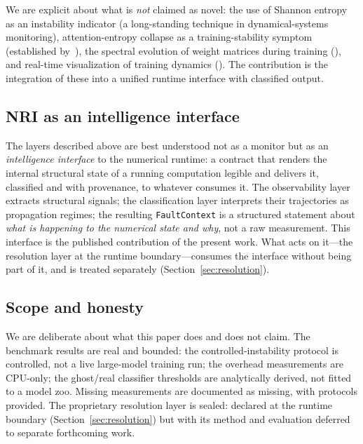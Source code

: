 \documentclass[11pt,a4paper]{article}
\theoremstyle{plain}
\begin{document}
We are explicit about what is \emph{not} claimed as novel: the use of
Shannon entropy as an instability indicator (a long-standing technique
in dynamical-systems monitoring), attention-entropy collapse as a
training-stability symptom (established by~\citealt{zhai2023sigma}),
the spectral evolution of weight matrices during training
(\citealt{martin2021implicit,yunis2024spectral}), and real-time
visualization of training dynamics (\citealt{yang2024neural}).
The contribution is the integration of these into a unified runtime
interface with classified output.

\subsection{NRI as an intelligence interface}

The layers described above are best understood not as a monitor but as
an \emph{intelligence interface} to the numerical runtime: a contract
that renders the internal structural state of a running computation
legible and delivers it, classified and with provenance, to whatever
consumes it. The observability layer extracts structural signals; the
classification layer interprets their trajectories as propagation
regimes; the resulting \texttt{FaultContext} is a structured statement
about \emph{what is happening to the numerical state and why}, not a raw
measurement. This interface is the published contribution of the present
work. What acts on it---the resolution layer at the runtime
boundary---consumes the interface without being part of it, and is
treated separately (Section~\ref{sec:resolution}).

\subsection{Scope and honesty}

We are deliberate about what this paper does and does not claim.
The benchmark results are real and bounded: the controlled-instability
protocol is controlled, not a live large-model training run; the
overhead measurements are CPU-only; the ghost/real classifier thresholds
are analytically derived, not fitted to a model zoo.
Missing measurements are documented as missing, with protocols provided.
The proprietary resolution layer is sealed: declared at the runtime
boundary (Section~\ref{sec:resolution}) but with its method and evaluation
deferred to separate forthcoming work.

\end{document}
